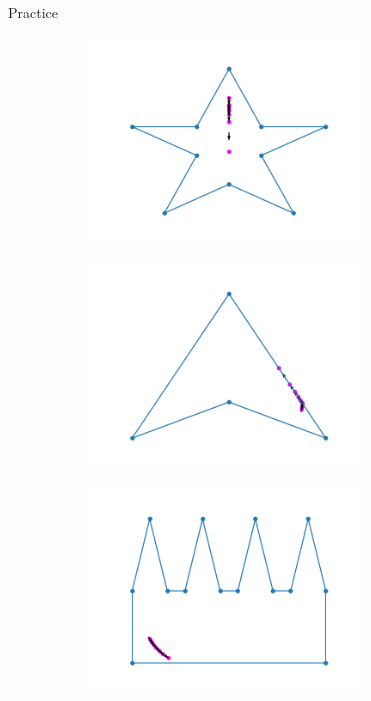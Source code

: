 \documentclass{beamer}
\begin{document}
\begin{frame}{Practice}
	\begin{figure}[h!]
		\centering
		\begin{subfigure}{0.4\textwidth}
			\centering
			\includegraphics[width = 0.8\textwidth]{Images/pentagram_gradient.png}
			\caption{}
			\label{fig:star_gradient}
		\end{subfigure}
		\begin{subfigure}{0.4\textwidth}
			\centering
			\includegraphics[width = 0.8\textwidth]{Images/concave_triangle_gradient.png}
			\caption{}
			\label{fig:concave_gradient}
		\end{subfigure}
		\begin{subfigure}{0.4\textwidth}
			\centering
			\includegraphics[width = 0.8\textwidth]{Images/comb_gradient.png}

\end{subfigure}
\end{figure}
\end{frame}
\end{document}
